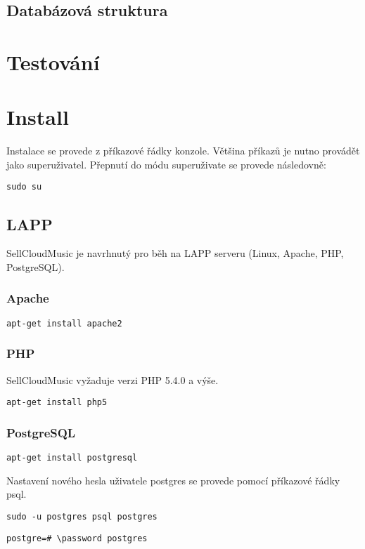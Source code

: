 \documentclass[12pt]{article}
\begin{document}
\subsection{Databázová struktura}

\section{Testování}


\section{Install}

Instalace se provede z příkazové řádky konzole. Většina příkazů je nutno provádět jako superuživatel. Přepnutí do módu superuživate se provede následovně:\newline

\texttt{sudo su}

\subsection{LAPP}

SellCloudMusic je navrhnutý pro běh na LAPP serveru (Linux, Apache, PHP, PostgreSQL).

\subsubsection{Apache}
\texttt{apt-get install apache2}

\subsubsection{PHP}

SellCloudMusic vyžaduje verzi PHP 5.4.0 a výše.\newline

\texttt{apt-get install php5}

\subsubsection{PostgreSQL}

\texttt{apt-get install postgresql}

Nastavení nového hesla uživatele postgres se provede pomocí příkazové řádky psql.\newline

\texttt{sudo -u postgres psql postgres}

\texttt{postgre=\# \textbackslash password postgres}\newline
\end{document}
